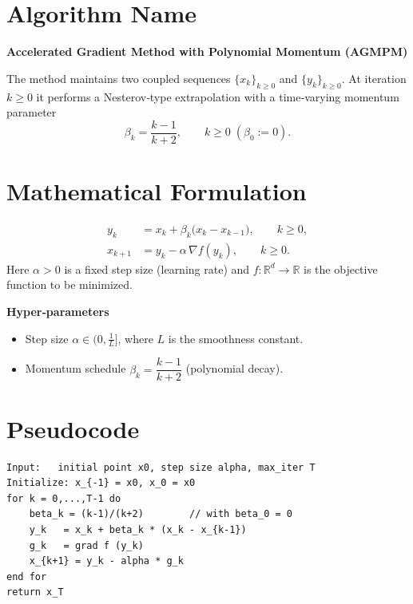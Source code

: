 \documentclass{article}
\newcommand{\R}{\mathbb{R}}
\begin{document}
\section*{Algorithm Name}
\textbf{Accelerated Gradient Method with Polynomial Momentum (AGMPM)}  

The method maintains two coupled sequences $\{x_k\}_{k\ge 0}$ and $\{y_k\}_{k\ge 0}$.
At iteration $k\ge 0$ it performs a Nesterov‑type extrapolation with a
time‑varying momentum parameter 
\[
\beta_k=\frac{k-1}{k+2},
\qquad k\ge 0\;( \beta_0:=0).
\]

\section*{Mathematical Formulation}
\begin{align}
y_k &= x_k+\beta_k\bigl(x_k-x_{k-1}\bigr), \qquad k\ge 0, \label{eq:extrap}\\
x_{k+1} &= y_k - \alpha \,\nabla f(y_k), \qquad k\ge 0.\label{eq:update}
\end{align}
Here $\alpha>0$ is a fixed step size (learning rate) and $f:\R^d\to\R$ is the
objective function to be minimized.

\medskip
\noindent\textbf{Hyper‑parameters}
\begin{itemize}[nosep]
    \item Step size $\alpha\in (0,\frac{1}{L}]$, where $L$ is the smoothness constant.
    \item Momentum schedule $\beta_k=\dfrac{k-1}{k+2}$ (polynomial decay).
\end{itemize}

\section*{Pseudocode}
\begin{verbatim}
Input:   initial point x0, step size alpha, max_iter T
Initialize: x_{-1} = x0, x_0 = x0
for k = 0,...,T-1 do
    beta_k = (k-1)/(k+2)        // with beta_0 = 0
    y_k   = x_k + beta_k * (x_k - x_{k-1})
    g_k   = grad f (y_k)
    x_{k+1} = y_k - alpha * g_k
end for
return x_T
\end{verbatim}

\end{document}
